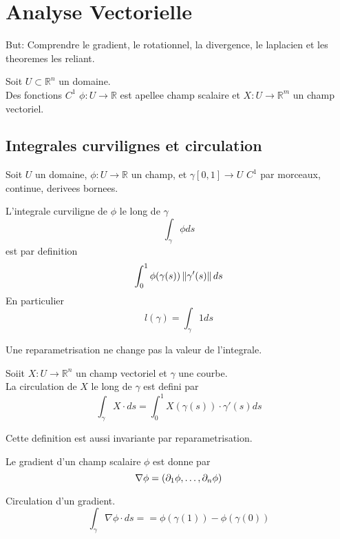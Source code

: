 \documentclass[../main.tex]{subfiles}
\begin{document}
\section{Analyse Vectorielle}
But: Comprendre le gradient, le rotationnel, la divergence, le laplacien et les theoremes les reliant.\\
\begin{defn}
Soit $U \subset \mathbb{R}^n$ un domaine.\\
Des fonctions $C^1$ $\phi: U \to \mathbb{R}$ est apellee champ scalaire et $X: U\to \mathbb{R}^m$ un champ vectoriel.
\end{defn}
\subsection{Integrales curvilignes et circulation}
Soit $U$ un domaine, $\phi:U\to \mathbb{R}$ un champ, et $\gamma [ 0,1] \to U$ $C^{1}$ par morceaux, continue, derivees bornees.
\begin{defn}
	L'integrale curviligne de $\phi$ le long de $\gamma$ 
	\[ 
	\int_{ \gamma }^{  }\phi ds
	\]
	est par definition
	\[ 
	\int_{ 0 }^{ 1 } \phi( \gamma( s) ) \left\lVert \gamma'( s) \right\rVert ds
	\]
	En particulier
	\[ 
	l( \gamma) = \int_\gamma 1 ds
	\]
	
	
\end{defn}
\begin{rmq}
Une reparametrisation ne change pas la valeur de l'integrale.
\end{rmq}
\begin{defn}[Circulation]
	Soiit $X:U\to \mathbb{R}^n$ un champ vectoriel et $\gamma$ une courbe.\\
	La circulation de $X$ le long de $\gamma$ est defini par
	\[ 
	\int_{ \gamma }^{  }X \cdot ds = \int_{ 0 }^{ 1 }X( \gamma( s) ) \cdot \gamma'( s) ds
	\]
	
\end{defn}
\begin{rmq}
Cette definition est aussi invariante par reparametrisation.
\end{rmq}
\begin{defn}[Gradient]
	Le gradient d'un champ scalaire $\phi$ est donne par
	\[ 
	\nabla \phi = ( \partial_1\phi,\ldots,\partial_n\phi) 
	\]
	    	
\end{defn}
\begin{propo}
Circulation d'un gradient.
\[ 
\int_{ \gamma }^{  }\nabla\phi\cdot ds = = \phi( \gamma( 1) ) -\phi( \gamma( 0) ) 
\]
\end{propo}
\end{document}
